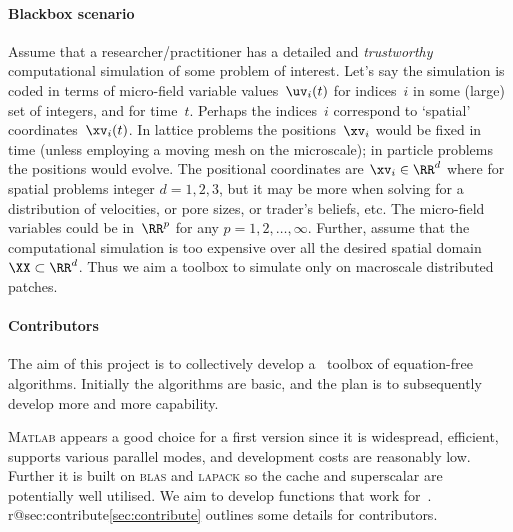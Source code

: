 \paragraph{Blackbox scenario}
Assume that a researcher\slash practitioner has a detailed and \emph{trustworthy} computational simulation of some problem of interest.
Let's say the simulation is coded in terms of micro-field variable values~\(\uv_i(t)\) for indices~\(i\) in some (large) set of integers, and for time~\(t\).
Perhaps the indices~\(i\) correspond to `spatial' coordinates~\(\xv_i(t)\).
In lattice problems the positions~\(\xv_i\) would be fixed in time (unless employing a moving mesh on the microscale); in particle problems the positions would evolve.
The positional coordinates are \(\xv_i\in\RR^{d}\) where for spatial problems integer \(d=1,2,3\), but it may be more when solving for a distribution of velocities, or pore sizes, or trader's beliefs, etc.
The micro-field variables could be in~\(\RR^{p}\) for any \(p=1,2,\ldots,\infty\).
Further, assume that the computational simulation is too expensive over all the desired spatial domain~\(\XX\subset\RR^{d}\).
Thus we aim a toolbox to simulate only on macroscale distributed patches.



\paragraph{Contributors}
The aim of this project is to collectively develop a \script\ toolbox of equation-free algorithms.
Initially the algorithms are basic, and the plan is to subsequently develop more and more capability.

\textsc{Matlab} appears a good choice for a first version since it is widespread, efficient, supports various parallel modes, and development costs are reasonably low.
Further it is built on \textsc{blas} and \textsc{lapack} so the cache and superscalar \cpu{} are potentially well utilised.
We aim to develop functions that work for~\script.
\ifcsname r@sec:contribute\endcsname\cref{sec:contribute} outlines some details for contributors.\fi


